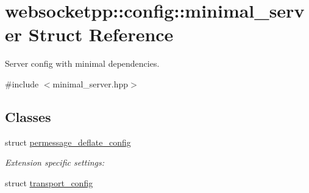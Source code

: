\hypertarget{structwebsocketpp_1_1config_1_1minimal__server}{}\section{websocketpp\+:\+:config\+:\+:minimal\+\_\+server Struct Reference}
\label{structwebsocketpp_1_1config_1_1minimal__server}


Server config with minimal dependencies.  




{\ttfamily \#include $<$minimal\+\_\+server.\+hpp$>$}

\subsection*{Classes}
\begin{DoxyCompactItemize}
\item 
struct \mbox{\hyperlink{structwebsocketpp_1_1config_1_1minimal__server_1_1permessage__deflate__config}{permessage\+\_\+deflate\+\_\+config}}
\begin{DoxyCompactList}\small\item\em Extension specific settings\+: \end{DoxyCompactList}\item 
struct \mbox{\hyperlink{structwebsocketpp_1_1config_1_1minimal__server_1_1transport__config}{transport\+\_\+config}}
\end{DoxyCompactItemize}
